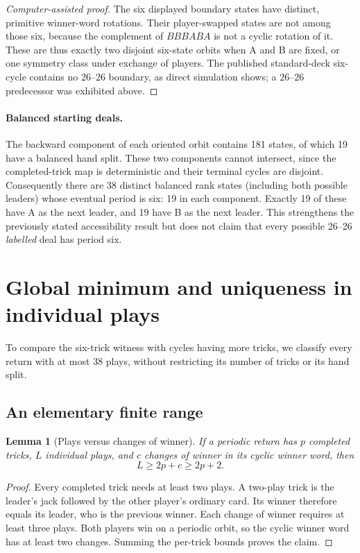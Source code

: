 \documentclass[11pt]{article}
\newtheorem{lemma}{Lemma}
\begin{document}
\begin{proof}[Computer-assisted proof]
The six displayed boundary states have distinct, primitive winner-word
rotations. Their player-swapped states are not among those six, because the
complement of $BBBABA$ is not a cyclic rotation of it. These are thus
exactly two disjoint six-state orbits when A and B are fixed, or one
symmetry class under exchange of players. The published standard-deck
six-cycle contains no $26$--$26$ boundary, as direct simulation shows; a
$26$--$26$ predecessor was exhibited above.
\end{proof}

\paragraph{Balanced starting deals.}
The backward component of each oriented orbit contains 181 states, of
which 19 have a balanced hand split. These two components cannot intersect,
since the completed-trick map is deterministic and their terminal cycles
are disjoint. Consequently there are 38 distinct balanced rank states
(including both possible leaders) whose eventual period is six: 19 in each
component. Exactly 19 of these have A as the next leader, and 19 have B
as the next leader. This strengthens the previously stated accessibility
result but does not claim that every possible 26--26 \emph{labelled} deal
has period six.

\section{Global minimum and uniqueness in individual plays}\label{sec:global-plays}

To compare the six-trick witness with cycles having more tricks, we classify
every return with at most 38 plays, without restricting its number of tricks
or its hand split.

\subsection{An elementary finite range}

\begin{lemma}[Plays versus changes of winner]\label{lem:play-range}
If a periodic return has $p$ completed tricks, $L$ individual plays, and $c$
changes of winner in its cyclic winner word, then
\[
L\ge2p+c\ge2p+2.
\]
\end{lemma}
\begin{proof}
Every completed trick needs at least two plays. A two-play trick is the
leader's jack followed by the other player's ordinary card. Its winner
therefore equals its leader, who is the previous winner. Each change of
winner requires at least three plays. Both players win on a periodic orbit,
so the cyclic winner word has at least two changes. Summing the per-trick
bounds proves the claim.
\end{proof}
\end{document}
